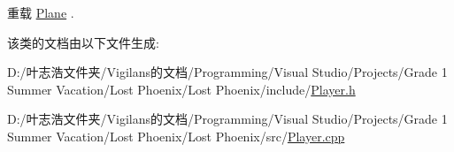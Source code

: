 重载 \hyperlink{class_plane_a7fbb07f76503fe057772e01f542afc32}{Plane} .



该类的文档由以下文件生成\+:\begin{DoxyCompactItemize}
\item 
D\+:/叶志浩文件夹/\+Vigilans的文档/\+Programming/\+Visual Studio/\+Projects/\+Grade 1 Summer Vacation/\+Lost Phoenix/\+Lost Phoenix/include/\hyperlink{_player_8h}{Player.\+h}\item 
D\+:/叶志浩文件夹/\+Vigilans的文档/\+Programming/\+Visual Studio/\+Projects/\+Grade 1 Summer Vacation/\+Lost Phoenix/\+Lost Phoenix/src/\hyperlink{_player_8cpp}{Player.\+cpp}\end{DoxyCompactItemize}
